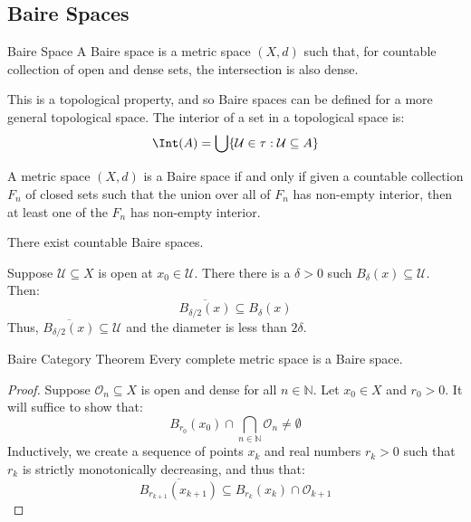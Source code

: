 \documentclass[crop=false,class=book,oneside]{standalone}
\begin{document}
        \subsection{Baire Spaces}
            \begin{ldefinition}{Baire Space}
            A Baire space is a metric space $(X,d)$ such that, for
            countable collection of open and dense sets, the
            intersection is also dense.
        \end{ldefinition}
            This is a topological property, and so Baire spaces can
            be defined for a more general topological space. The
            interior of a set in a topological space is:
            \begin{equation}
            \Int(A)=
            \bigcup\{\mathcal{U}\in\tau:\mathcal{U}\subseteq{A}\}
        \end{equation}
            \begin{theorem}
            A metric space $(X,d)$ is a Baire space if and only
            if given a countable collection $F_{n}$ of closed
            sets such that the union over all of $F_{n}$ has
            non-empty interior, then at least one of the $F_{n}$
            has non-empty interior.
        \end{theorem}
            \begin{theorem}
            There exist countable Baire spaces.
        \end{theorem}
            Suppose $\mathcal{U}\subseteq{X}$ is open at
            $x_{0}\in\mathcal{U}$. There there is a $\delta>0$ such
            $B_{\delta}(x)\subseteq\mathcal{U}$. Then:
            \begin{equation}
            \overline{B_{\delta/2}(x)}\subseteq{B}_{\delta}(x)
        \end{equation}
            Thus, $\overline{B_{\delta/2}(x)}\subseteq\mathcal{U}$
            and the diameter is less than $2\delta$.
            \begin{ltheorem}{Baire Category Theorem}
            Every complete metric space is a Baire space.
        \end{ltheorem}
            \begin{proof}
            Suppose $\mathcal{O}_{n}\subseteq{X}$ is open and
            dense for all $n\in\mathbb{N}$. Let $x_{0}\in{X}$ and
            $r_{0}>0$. It will suffice to show that:
            \begin{equation}
                B_{r_{0}}(x_{0})\cap\bigcap_{n\in\mathbb{N}}
                    \mathcal{O}_{n}\ne\emptyset
            \end{equation}
            Inductively, we create a sequence of points $x_{k}$
            and real numbers $r_{k}>0$ such that $r_{k}$ is strictly
            monotonically decreasing, and thus that:
            \begin{equation}
                \overline{B_{r_{k+1}}(x_{k+1})}
                \subseteq{B}_{r_{k}}(x_{k})\cap\mathcal{O}_{k+1}
            \end{equation}
        \end{proof}
\end{document}
